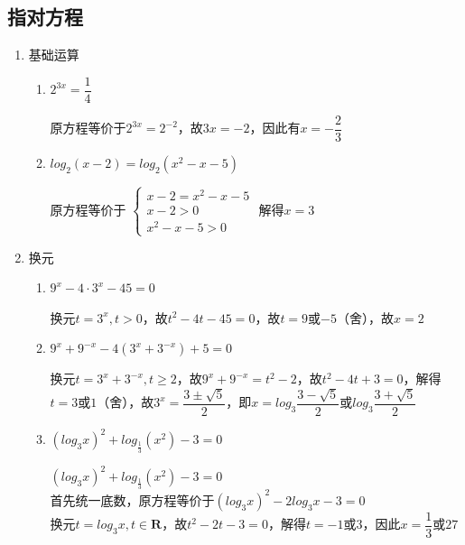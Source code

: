 \subsection*{指对方程}
\begin{enumerate}
    \item 基础运算
    \begin{enumerate}
        \item $2^{3x} = \dfrac{1}{4}$
        \begin{jieda}
            原方程等价于$2^{3x} = 2^{-2}$，故$3x = -2$，因此有$x = -\dfrac{2}{3}$
        \end{jieda}
        \item $log_2(x-2) = log_2(x^2-x-5)$
        \begin{jieda}
            原方程等价于 $\left \{ \begin{array}{ll}
                 x-2 = x^2-x-5  \\
                 x - 2 > 0 \\
                 x^2-x-5 > 0
            \end{array}\right.$ 解得$x = 3$
        \end{jieda}
    \end{enumerate}
    \item 换元
    \begin{enumerate}
        \item $9^x-4 \cdot 3^x - 45 = 0$
        \begin{jieda}
            换元$t = 3^x, t > 0$，故$t^2-4t - 45 = 0$，故$t = 9$或$-5$（舍），故$x = 2$
        \end{jieda}
        \item $9^x + 9^{-x} - 4(3^x+3^{-x}) + 5 = 0$
        \begin{jieda}
            换元$t = 3^x+3^{-x}, t \geq 2$，故$9^x + 9^{-x} = t^2-2$，故$t^2-4t+3 = 0$，解得$t =3$或$1$（舍），故$3^x = \dfrac{3\pm\sqrt{5}}{2}$，即$x = log_3{\dfrac{3-\sqrt{5}}{2}}$或$log_3{\dfrac{3+\sqrt{5}}{2}}$
        \end{jieda}
        \item $(log_3x)^2+log_{\frac{1}{3}}(x^2)-3 = 0$
        \begin{jieda}
            $(log_3x)^2+log_{\frac{1}{3}}(x^2)-3 = 0$ \\
            首先统一底数，原方程等价于$(log_3x)^2-2log_3x-3 = 0$\\
            换元$t = log_3x, t \in \mathbf{R}$，故$t^2 - 2t - 3 = 0$，解得$t = -1$或$3$，因此$x = \dfrac{1}{3}$或$27$
        \end{jieda}

\end{enumerate}
\end{enumerate}
